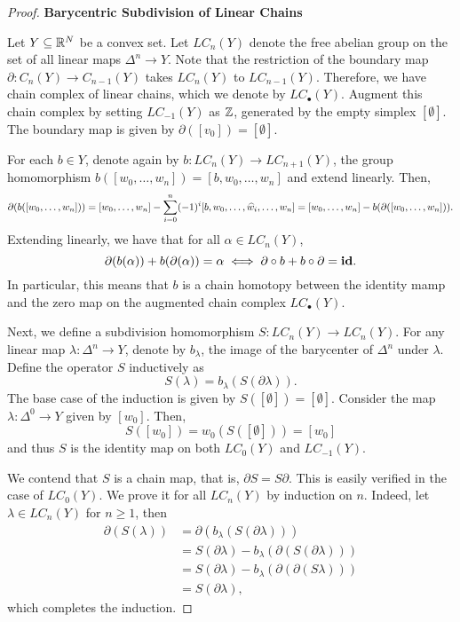 \begin{proof}
\noindent\textbf{Barycentric Subdivision of Linear Chains}

Let $Y\subseteq\mathbb{R}^N$ be a convex set. Let $LC_n(Y)$ denote the free abelian group on the set of all linear maps $\Delta^n\to Y$. Note that the restriction of the boundary map $\partial: C_n(Y)\to C_{n - 1}(Y)$ takes $LC_n(Y)$ to $LC_{n - 1}(Y)$. Therefore, we have chain complex of linear chains, which we denote by $LC_{\bullet}(Y)$. Augment this chain complex by setting $LC_{-1}(Y)$ as $\mathbb{Z}$, generated by the empty simplex $[\emptyset]$. The boundary map is given by $\partial([v_0]) = [\emptyset]$.

For each $b\in Y$, denote again by $b: LC_n(Y)\to LC_{n + 1}(Y)$, the group homomorphism $b([w_0,\dots,w_n]) = [b,w_0,\dots,w_n]$ and extend linearly. Then, 
\begin{equation*}
    \partial(b([w_0,\dots,w_n])) = [w_0,\dots,w_n] - \sum_{i = 0}^n(-1)^i[b,w_0,\dots,\widehat{w}_i,\dots,w_n] = [w_0,\dots,w_n] - b(\partial([w_0,\dots,w_n])).
\end{equation*}
Extending linearly, we have that for all $\alpha\in LC_n(Y)$, 
\begin{equation*}
    \partial(b(\alpha)) + b(\partial(\alpha)) = \alpha\iff \partial\circ b + b\circ\partial = \mathbf{id}.
\end{equation*}
In particular, this means that $b$ is a chain homotopy between the identity mamp and the zero map on the augmented chain complex $LC_\bullet(Y)$.

Next, we define a subdivision homomorphism $S: LC_n(Y)\to LC_n(Y)$. For any linear map $\lambda:\Delta^n\to Y$, denote by $b_\lambda$, the image of the barycenter of $\Delta^n$ under $\lambda$. Define the operator $S$ inductively as 
\begin{equation*}
    S(\lambda) = b_\lambda(S(\partial\lambda)).
\end{equation*}
The base case of the induction is given by $S([\emptyset]) = [\emptyset]$. Consider the map $\lambda:\Delta^0\to Y$ given by $[w_0]$. Then, 
\begin{equation*}
    S([w_0]) = w_0(S([\emptyset])) = [w_0]
\end{equation*}
and thus $S$ is the identity map on both $LC_0(Y)$ and $LC_{-1}(Y)$. 

We contend that $S$ is a chain map, that is, $\partial S = S\partial$. This is easily verified in the case of $LC_0(Y)$. We prove it for all $LC_n(Y)$ by induction on $n$. Indeed, let $\lambda\in LC_n(Y)$ for $n\ge 1$, then 
\begin{align*}
    \partial(S(\lambda)) &= \partial(b_\lambda(S(\partial\lambda)))\\
    &= S(\partial\lambda) - b_\lambda(\partial(S(\partial\lambda)))\\
    &= S(\partial\lambda) - b_\lambda(\partial(\partial(S\lambda)))\\
    &= S(\partial\lambda),
\end{align*}
which completes the induction.


\end{proof}
